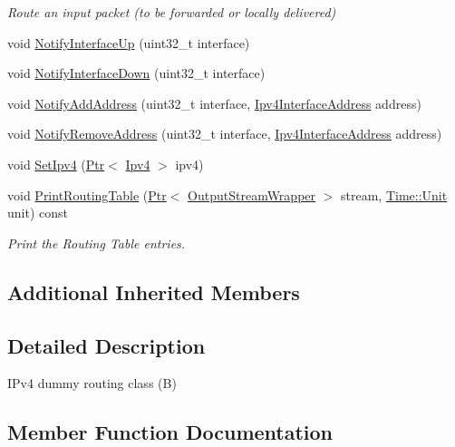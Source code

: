 \begin{DoxyCompactItemize}
\begin{DoxyCompactList}\small\item\em Route an input packet (to be forwarded or locally delivered) \end{DoxyCompactList}\item 
void \hyperlink{classIpv4BRouting_a6b892a70fc7ceb0bbab43a82a9ff86ff}{Notify\+Interface\+Up} (uint32\+\_\+t interface)
\item 
void \hyperlink{classIpv4BRouting_ac8ef78a4044ecad2af7ab825b57f0929}{Notify\+Interface\+Down} (uint32\+\_\+t interface)
\item 
void \hyperlink{classIpv4BRouting_a7467acf1e9b8c96d0267233485a5a31b}{Notify\+Add\+Address} (uint32\+\_\+t interface, \hyperlink{classns3_1_1Ipv4InterfaceAddress}{Ipv4\+Interface\+Address} address)
\item 
void \hyperlink{classIpv4BRouting_a683fdaada7e46b27ba90c8debb069916}{Notify\+Remove\+Address} (uint32\+\_\+t interface, \hyperlink{classns3_1_1Ipv4InterfaceAddress}{Ipv4\+Interface\+Address} address)
\item 
void \hyperlink{classIpv4BRouting_aa374c6adeaedb07efb307bc4540f7754}{Set\+Ipv4} (\hyperlink{classns3_1_1Ptr}{Ptr}$<$ \hyperlink{classns3_1_1Ipv4}{Ipv4} $>$ ipv4)
\item 
void \hyperlink{classIpv4BRouting_a4173f33e77b523bf1651fc08e76c3288}{Print\+Routing\+Table} (\hyperlink{classns3_1_1Ptr}{Ptr}$<$ \hyperlink{classns3_1_1OutputStreamWrapper}{Output\+Stream\+Wrapper} $>$ stream, \hyperlink{classns3_1_1Time_a87a7f4d29c68b047a72d291ad660295a}{Time\+::\+Unit} unit) const 
\begin{DoxyCompactList}\small\item\em Print the Routing Table entries. \end{DoxyCompactList}\end{DoxyCompactItemize}
\subsection*{Additional Inherited Members}


\subsection{Detailed Description}
I\+Pv4 dummy routing class (B) 

\subsection{Member Function Documentation}
